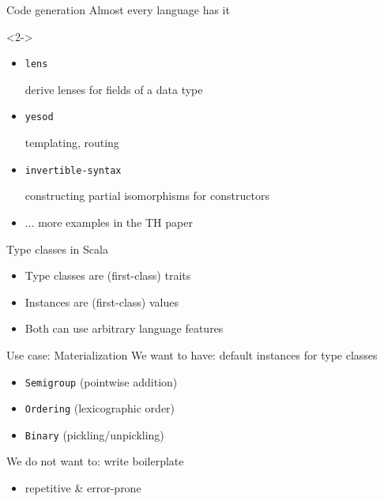 \documentclass{beamer}
\begin{document}
\begin{frame}{Code generation}
  Almost every language has it

  \begin{visibleenv}<2->
    \begin{itemize}
      \item \texttt{lens}

         derive lenses for fields of a data type
      \item \texttt{yesod}

        templating, routing
      \item \texttt{invertible-syntax}

        constructing partial isomorphisms for constructors

      \item ... more examples in the TH paper
    \end{itemize}
  \end{visibleenv}
\end{frame}

\begin{frame}{Type classes in Scala}
  \begin{itemize}
    \item Type classes are (first-class) traits
    \item Instances are (first-class) values
    \item<visible@2> Both can use arbitrary language features
  \end{itemize}
\end{frame}

\begin{frame}{Use case: Materialization}
  We want to have: default instances for type classes
  \begin{itemize}
    \item \texttt{Semigroup} (pointwise addition)
    \item \texttt{Ordering} (lexicographic order)
    \item \texttt{Binary} (pickling/unpickling)
  \end{itemize}

  \vspace{1em}
  We do not want to: write boilerplate
  \begin{itemize}
    \item repetitive \& error-prone
  \end{itemize}
\end{frame}
\end{document}

